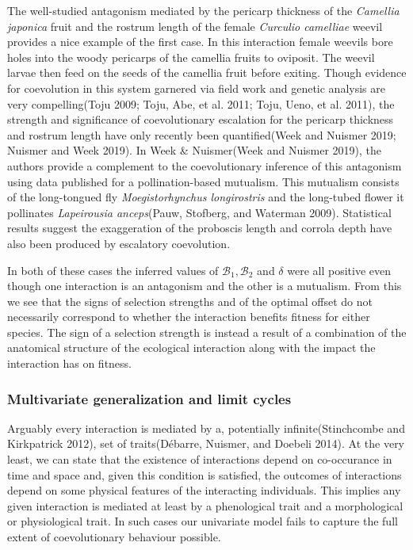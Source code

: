 \documentclass[]{article}
\begin{document}
The well-studied antagonism mediated by the pericarp thickness of the
\emph{Camellia japonica} fruit and the rostrum length of the female
\emph{Curculio camelliae} weevil provides a nice example of the first
case. In this interaction female weevils bore holes into the woody
pericarps of the camellia fruits to oviposit. The weevil larvae then
feed on the seeds of the camellia fruit before exiting. Though evidence
for coevolution in this system garnered via field work and genetic
analysis are very compelling(Toju 2009; Toju, Abe, et al. 2011; Toju,
Ueno, et al. 2011), the strength and significance of coevolutionary
escalation for the pericarp thickness and rostrum length have only
recently been quantified(Week and Nuismer 2019; Nuismer and Week 2019).
In Week \& Nuismer(Week and Nuismer 2019), the authors provide a
complement to the coevolutionary inference of this antagonism using data
published for a pollination-based mutualism. This mutualism consists of
the long-tongued fly \emph{Moegistorhynchus longirostris} and the
long-tubed flower it pollinates \emph{Lapeirousia anceps}(Pauw,
Stofberg, and Waterman 2009). Statistical results suggest the
exaggeration of the proboscis length and corrola depth have also been
produced by escalatory coevolution.

In both of these cases the inferred values of
\(\mathscr{B}_1,\mathscr{B}_2\) and \(\delta\) were all positive even
though one interaction is an antagonism and the other is a mutualism.
From this we see that the signs of selection strengths and of the
optimal offset do not necessarily correspond to whether the interaction
benefits fitness for either species. The sign of a selection strength is
instead a result of a combination of the anatomical structure of the
ecological interaction along with the impact the interaction has on
fitness.

\hypertarget{multivariate-generalization-and-limit-cycles}{%
\subsubsection{Multivariate generalization and limit
cycles}\label{multivariate-generalization-and-limit-cycles}}

Arguably every interaction is mediated by a, potentially
infinite(Stinchcombe and Kirkpatrick 2012), set of traits(Débarre,
Nuismer, and Doebeli 2014). At the very least, we can state that the
existence of interactions depend on co-occurance in time and space and,
given this condition is satisfied, the outcomes of interactions depend
on some physical features of the interacting individuals. This implies
any given interaction is mediated at least by a phenological trait and a
morphological or physiological trait. In such cases our univariate model
fails to capture the full extent of coevolutionary behaviour possible.
\end{document}
